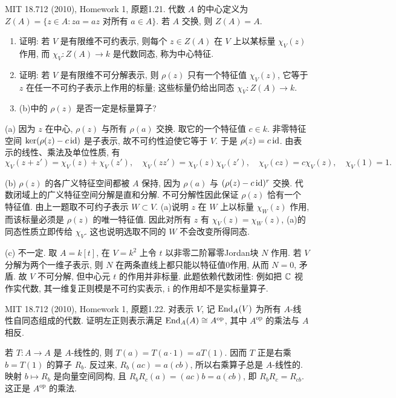 \begin{exercise}\label{hw:1.21}
MIT 18.712 (2010), Homework 1, 原题1.21. 代数 $A$ 的中心定义为 $Z(A)=\{z\in A:za=az\text{ 对所有 }a\in A\}$. 若 $A$ 交换, 则 $Z(A)=A$.
\begin{enumerate}[label=(\alph*)]
\item 证明: 若 $V$ 是有限维不可约表示, 则每个 $z\in Z(A)$ 在 $V$ 上以某标量 $\chi_V(z)$ 作用, 而 $\chi_V:Z(A)\to k$ 是代数同态, 称为中心特征.
\item 证明: 若 $V$ 是有限维不可分解表示, 则 $\rho(z)$ 只有一个特征值 $\chi_V(z)$, 它等于 $z$ 在任一不可约子表示上作用的标量; 这些标量仍给出同态 $\chi_V:Z(A)\to k$.
\item (b)中的 $\rho(z)$ 是否一定是标量算子?
\end{enumerate}
\end{exercise}
\begin{solution}
(a) 因为 $z$ 在中心, $\rho(z)$ 与所有 $\rho(a)$ 交换. 取它的一个特征值 $c\in k$. 非零特征空间 $\ker(\rho(z)-c\operatorname{id})$ 是子表示, 故不可约性迫使它等于 $V$. 于是 $\rho(z)=c\operatorname{id}$. 由表示的线性、乘法及单位性质, 有
\[
\chi_V(z+z')=\chi_V(z)+\chi_V(z'),\quad
\chi_V(zz')=\chi_V(z)\chi_V(z'),\quad
\chi_V(cz)=c\chi_V(z),\quad \chi_V(1)=1.
\]

(b) $\rho(z)$ 的各广义特征空间都被 $A$ 保持, 因为 $\rho(a)$ 与 $(\rho(z)-c\operatorname{id})^r$ 交换. 代数闭域上的广义特征空间分解是直和分解. 不可分解性因此保证 $\rho(z)$ 恰有一个特征值. 由上一题取不可约子表示 $W\subset V$. (a)说明 $z$ 在 $W$ 上以标量 $\chi_W(z)$ 作用, 而该标量必须是 $\rho(z)$ 的唯一特征值. 因此对所有 $z$ 有 $\chi_V(z)=\chi_W(z)$, (a)的同态性质立即传给 $\chi_V$. 这也说明选取不同的 $W$ 不会改变所得同态.

(c) 不一定. 取 $A=k[t]$, 在 $V=k^2$ 上令 $t$ 以非零二阶幂零Jordan块 $N$ 作用. 若 $V$ 分解为两个一维子表示, 则 $N$ 在两条直线上都只能以特征值0作用, 从而 $N=0$, 矛盾. 故 $V$ 不可分解, 但中心元 $t$ 的作用并非标量. 此题依赖代数闭性: 例如把 $\mathbb C$ 视作实代数, 其一维复正则模是不可约实表示, $\mathrm i$ 的作用却不是实标量算子.
\end{solution}

\begin{exercise}\label{hw:1.22}
MIT 18.712 (2010), Homework 1, 原题1.22. 对表示 $V$, 记 $\operatorname{End}_A(V)$ 为所有 $A$-线性自同态组成的代数. 证明左正则表示满足 $\operatorname{End}_A(A)\cong A^{\mathrm{op}}$, 其中 $A^{\mathrm{op}}$ 的乘法与 $A$ 相反.
\end{exercise}
\begin{solution}
若 $T:A\to A$ 是 $A$-线性的, 则 $T(a)=T(a\cdot1)=aT(1)$. 因而 $T$ 正是右乘 $b=T(1)$ 的算子 $R_b$. 反过来, $R_b(ac)=a(cb)$, 所以右乘算子总是 $A$-线性的. 映射 $b\mapsto R_b$ 是向量空间同构, 且 $R_bR_c(a)=(ac)b=a(cb)$, 即 $R_bR_c=R_{cb}$. 这正是 $A^{\mathrm{op}}$ 的乘法.
\end{solution}

